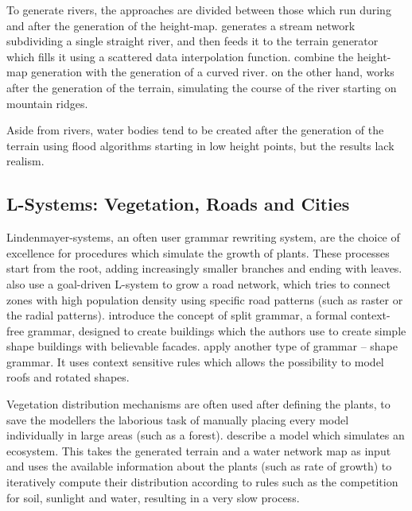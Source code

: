 \documentclass{acmtog}
\begin{document}
To generate rivers, the approaches are divided between those which run during and after the generation of the height-map. \cite{Kelley88} generates a stream network subdividing a single straight river, and then feeds it to the terrain generator which fills it using a scattered data interpolation function. \cite{Prusinkiewicz93} combine the height-map generation with the generation of a curved river. \cite{Belhadj05} on the other hand, works after the generation of the terrain, simulating the course of the river starting on mountain ridges.

Aside from rivers, water bodies tend to be created after the generation of the terrain using flood algorithms starting in low height points, but the results lack realism.

\subsection{L-Systems: Vegetation, Roads and Cities}
Lindenmayer-systems, an often user grammar rewriting system, are the choice of excellence for procedures which simulate the growth of plants. These processes start from the root, adding increasingly smaller branches and ending with leaves. \cite{Parish01} also use a goal-driven L-system to grow a road network, which tries to connect zones with high population density using specific road patterns (such as raster or the radial patterns). \cite{Wonka03} introduce the concept of split grammar, a formal context-free grammar, designed to create buildings which the authors use to create simple shape buildings with believable facades. \cite{Muller06} apply another type of grammar -- shape grammar. It uses context sensitive rules which allows the possibility to model roofs and rotated shapes.

Vegetation distribution mechanisms are often used after defining the plants, to save the modellers the laborious task of manually placing every model individually in large areas (such as a forest). \cite{Deussen98} describe a model which simulates an ecosystem. This takes the generated terrain and a water network map as input and uses the available information about the plants (such as rate of growth) to iteratively compute their distribution according to rules such as the competition for soil, sunlight and water, resulting in a very slow process.
\end{document}
